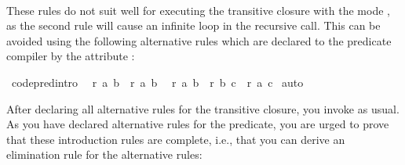 \begin{isabellebody}
%
\isatagquote
%
\begin{isamarkuptext}%
\\
\noindent {}%
\end{isamarkuptext}%
\isamarkuptrue%
%
\endisatagquote
{\isafoldquote}%
%
\isadelimquote
%
\endisadelimquote
%
\begin{isamarkuptext}%
\noindent These rules do not suit well for executing the transitive closure 
with the mode , as the second rule will
cause an infinite loop in the recursive call.
This can be avoided using the following alternative rules which are
declared to the predicate compiler by the attribute \hyperlink{attribute.code-pred-intro}{\mbox{}}:%
\end{isamarkuptext}%
\isamarkuptrue%
%
\isadelimquote
%
\endisadelimquote
%
\isatagquote
{}\isamarkupfalse%
\ {\isacharbrackleft}code{\isacharunderscore}pred{\isacharunderscore}intro{\isacharbrackright}{\isacharcolon}\isanewline
\ \ {\isachardoublequoteopen}r\ a\ b\ {\isasymLongrightarrow}\ r\isactrlsup {\isacharplus}\isactrlsup {\isacharplus}\ a\ b{\isachardoublequoteclose}\isanewline
\ \ {\isachardoublequoteopen}r\ a\ b\ {\isasymLongrightarrow}\ r\isactrlsup {\isacharplus}\isactrlsup {\isacharplus}\ b\ c\ {\isasymLongrightarrow}\ r\isactrlsup {\isacharplus}\isactrlsup {\isacharplus}\ a\ c{\isachardoublequoteclose}\isanewline
{}\isamarkupfalse%
\ auto%
\endisatagquote
{\isafoldquote}%
%
\isadelimquote
%
\endisadelimquote
%
\begin{isamarkuptext}%
\noindent After declaring all alternative rules for the transitive closure,
you invoke \hyperlink{command.code-pred}{\mbox{}} as usual.
As you have declared alternative rules for the predicate, you are urged to prove that these
introduction rules are complete, i.e., that you can derive an elimination rule for the
alternative rules:%
\end{isamarkuptext}%
\isamarkuptrue%
%
\isadelimquote
%
\endisadelimquote
%
\isatagquote
{}\isamarkupfalse%

\end{isabellebody}
